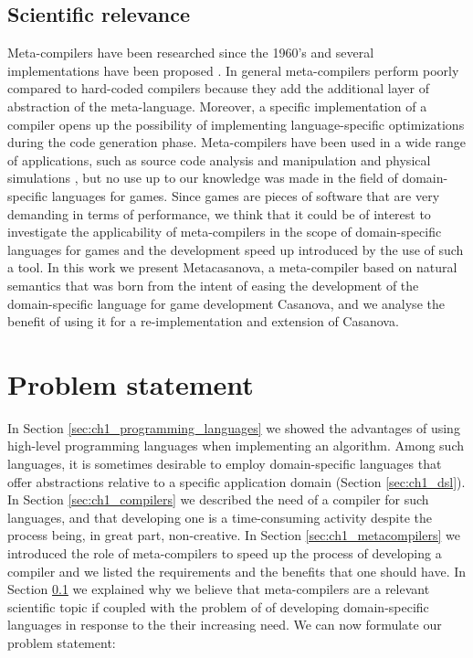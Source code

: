 \subsection{Scientific relevance} %
\label{sec:ch1_scientific_relevance}
Meta-compilers have been researched since the 1960's \cite{schorre1964meta} and several implementations have been proposed \cite{ borovansky1998overview, bravenboer2008stratego, klint2009rascal, pettersson1996compiler, verdejo2006executable}. In general meta-compilers perform poorly compared to hard-coded compilers because they add the additional layer of abstraction of the meta-language. Moreover, a specific implementation of a compiler opens up the possibility of implementing language-specific optimizations during the code generation phase. Meta-compilers have been used in a wide range of applications, such as source code analysis and manipulation and physical simulations \cite{kaagedal1998generating}, but no use up to our knowledge was made in the field of domain-specific languages for games. Since games are pieces of software that are very demanding in terms of performance, we think that it could be of interest to investigate the applicability of meta-compilers in the scope of domain-specific languages for games and the development speed up introduced by the use of such a tool. In this work we present Metacasanova, a meta-compiler based on natural semantics that was born from the intent of easing the development of the domain-specific language for game development Casanova, and we analyse the benefit of using it for a re-implementation and extension of Casanova.

\section{Problem statement}
\label{sec:ch1_problem_statement}
In Section \ref{sec:ch1_programming_languages} we showed the advantages of using high-level programming languages when implementing an algorithm. Among such languages, it is sometimes desirable to employ domain-specific languages that offer abstractions relative to a specific application domain (Section \ref{sec:ch1_dsl}). In Section \ref{sec:ch1_compilers} we described the need of a compiler for such languages, and that developing one is a time-consuming activity despite the process being, in great part, non-creative. In Section \ref{sec:ch1_metacompilers} we introduced the role of meta-compilers to speed up the process of developing a compiler and we listed the requirements and the benefits that one should have. In Section \ref{sec:ch1_scientific_relevance} we explained why we believe that meta-compilers are a relevant scientific topic if coupled with the problem of of developing domain-specific languages in response to the their increasing need. We can now formulate our problem statement:

